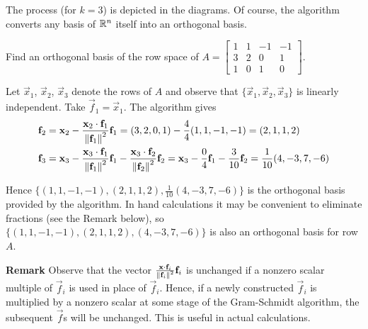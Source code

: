 \documentclass{ximera}
\begin{document}
The process (for $k = 3$) is depicted in the diagrams. Of course, the algorithm converts any basis of $\mathbb{R}^n$ itself into an orthogonal basis.


\begin{example}\label{023743}
Find an orthogonal basis of the row space of $A = \begin{bmatrix}
1 & 1 & -1 & -1\\
3 & 2 & 0 & 1\\
1 & 0 & 1 & 0
\end{bmatrix}$.

\begin{explanation}
  Let $\vec{x}_{1}$, $\vec{x}_{2}$, $\vec{x}_{3}$ denote the rows of $A$ and observe that $\{\vec{x}_{1}, \vec{x}_{2}, \vec{x}_{3}\}$ is linearly independent. Take $\vec{f}_{1} = \vec{x}_{1}$. The algorithm gives
\begin{align*}
\mathbf{f}_{2} &= \mathbf{x}_{2} - \frac{\mathbf{x}_{2} \cdot \mathbf{f}_{1}}{\left\lVert\mathbf{f}_{1}\right\rVert^2}\mathbf{f}_{1} = (3, 2, 0, 1) - \frac{4}{4}(1, 1, -1, -1) = (2, 1, 1, 2) \\
\mathbf{f}_{3} &= \mathbf{x}_{3} - \frac{\mathbf{x}_{3} \cdot \mathbf{f}_{1}}{\left\lVert\mathbf{f}_{1}\right\rVert^2}\mathbf{f}_{1} - \frac{\mathbf{x}_{3} \cdot \mathbf{f}_{2}}{\left\lVert\mathbf{f}_{2}\right\rVert^2}\mathbf{f}_{2} = \mathbf{x}_{3} - \frac{0}{4}\mathbf{f}_{1} - \frac{3}{10}\mathbf{f}_{2} = \frac{1}{10}(4, -3, 7, -6)
\end{align*}

Hence $\{(1, 1, -1, -1), (2, 1, 1, 2), \frac{1}{10}(4, -3, 7, -6)\}$ is the orthogonal basis provided by the algorithm. In
hand calculations it may be convenient to eliminate fractions (see the Remark below), so $\{(1, 1, -1, -1), (2, 1, 1, 2), (4, -3, 7, -6)\}$ is also an orthogonal basis for row $A$.
\end{explanation}
\end{example}

\textbf{Remark}
Observe that the vector $\frac{\mathbf{x} \cdot \mathbf{f}_{i}}{\left\lVert\mathbf{f}_{i}\right\rVert^2}\mathbf{f}_{i}$
 is unchanged if a nonzero scalar multiple of $\vec{f}_{i}$ is used in place of $\vec{f}_{i}$. Hence, if a newly constructed $\vec{f}_{i}$ is multiplied by a nonzero scalar at some stage of the Gram-Schmidt algorithm, the subsequent $\vec{f}$s will be unchanged. This is useful in actual calculations.
\end{document}
